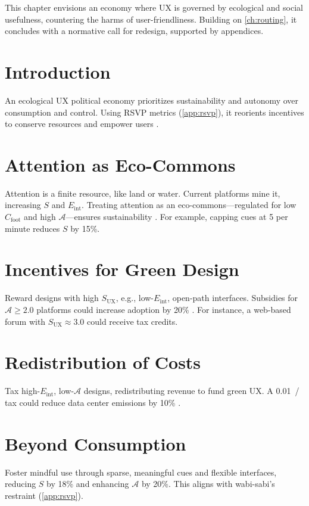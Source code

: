 \documentclass[openany]{book}
\newcommand{\Sent}{S} %
\newcommand{\Eint}{E_{\mathrm{int}}} %
\newcommand{\Cfoot}{C_{\mathrm{foot}}} %
\newcommand{\Auton}{\mathcal{A}} %
\newcommand{\SUX}{S_{\mathrm{UX}}} %
\newcommand{\kWh}{\mathrm{kWh}}
\begin{document}
This chapter envisions an economy where UX is governed by ecological and social usefulness, countering the harms of user-friendliness. Building on \cref{ch:routing}, it concludes with a normative call for redesign, supported by appendices.

\section{Introduction}
\label{sec:vision-intro}
An ecological UX political economy prioritizes sustainability and autonomy over consumption and control. Using RSVP metrics (\cref{app:rsvp}), it reorients incentives to conserve resources and empower users \citep{colak2024,doctorow2022}.

\section{Attention as Eco-Commons}
\label{sec:vision-commons}
Attention is a finite resource, like land or water. Current platforms mine it, increasing $\Sent$ and $\Eint$. Treating attention as an eco-commons---regulated for low $\Cfoot$ and high $\Auton$---ensures sustainability \citep{colak2024}. For example, capping cues at 5 per minute reduces $\Sent$ by 15\%.

\section{Incentives for Green Design}
\label{sec:vision-incentives}
Reward designs with high $\SUX$, e.g., low-$\Eint$, open-path interfaces. Subsidies for $\Auton \geq 2.0$ platforms could increase adoption by 20\% \citep{doctorow2022}. For instance, a web-based forum with $\SUX \approx 3.0$ could receive tax credits.

\section{Redistribution of Costs}
\label{sec:vision-costs}
Tax high-$\Eint$, low-$\Auton$ designs, redistributing revenue to fund green UX. A \SI{0.01}{\USD/\kWh} tax could reduce data center emissions by 10\% \citep{adobe2021}.

\section{Beyond Consumption}
\label{sec:vision-beyond}
Foster mindful use through sparse, meaningful cues and flexible interfaces, reducing $\Sent$ by 18\% and enhancing $\Auton$ by 20\%. This aligns with wabi-sabi’s restraint (\cref{app:rsvp}).
\end{document}
